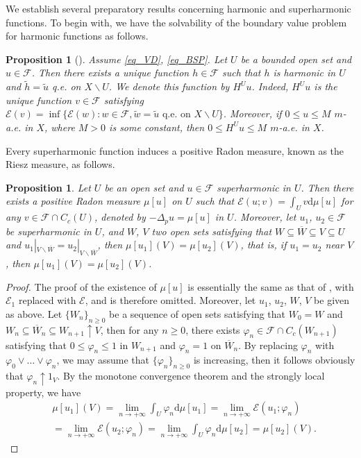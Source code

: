 \documentclass[11pt,a4paper]{article}
\numberwithin{equation}{section}
\theoremstyle{plain}
\newtheorem{proposition}[theorem]{Proposition}
\theoremstyle{definition}
\begin{document}
We establish several preparatory results concerning harmonic and superharmonic functions. To begin with, we have the solvability of the boundary value problem for harmonic functions as follows.

\begin{proposition}[{\cite[Proposition 4.2]{Yan25c}}]\label{prop_harm_exist}
Assume \ref{eq_VD}, \ref{eq_BSP}. Let $U$ be a bounded open set and $u\in\mathcal{F}$. Then there exists a unique function $h\in\mathcal{F}$ such that $h$ is harmonic in $U$ and $\widetilde{h}=\widetilde{u}$ q.e. on $X\backslash U$. We denote this function by $H^Uu$. Indeed, $H^Uu$ is the unique function $v\in \mathcal{F}$ satisfying $\mathcal{E}(v)=\inf \{\mathcal{E}(w):w\in \mathcal{F},\widetilde{w}=\widetilde{u}\text{ q.e. on }X\backslash U\}$. Moreover, if $0\le u\le M$ $m$-a.e. in $X$, where $M>0$ is some constant, then $0\le H^Uu\le M$ $m$-a.e. in $X$.
\end{proposition}

Every superharmonic function induces a positive Radon measure, known as the Riesz measure, as follows.

\begin{proposition}\label{prop_super_meas}
Let $U$ be an open set and $u\in\mathcal{F}$ superharmonic in $U$. Then there exists a positive Radon measure $\mu[u]$ on $U$ such that $\mathcal{E}(u;v)=\int_Uv\mathrm{d}\mu[u]$ for any $v\in\mathcal{F}\cap C_c(U)$, denoted by $-\Delta_pu=\mu[u]$ in $U$. Moreover, let $u_1$, $u_2\in\mathcal{F}$ be superharmonic in $U$, and $W$, $V$ two open sets satisfying that $W\subseteq \overline{W}\subseteq V\subseteq U$ and $u_1|_{V\backslash\overline{W}}=u_2|_{V\backslash\overline{W}}$, then $\mu[u_1](V)=\mu[u_2](V)$, that is, if $u_1=u_2$ near $V$, then $\mu[u_1](V)=\mu[u_2](V)$.
\end{proposition}

\begin{proof}
The proof of the existence of $\mu[u]$ is essentially the same as that of \cite[Proposition 8.9, ``(3)$\Rightarrow$(1)"]{Yan25a}, with $\mathcal{E}_1$ replaced with $\mathcal{E}$, and is therefore omitted. Moreover, let $u_1$, $u_2$, $W$, $V$ be given as above. Let $\{W_n\}_{n\ge0}$ be a sequence of open sets satisfying that $W_0=W$ and $W_n\subseteq\overline{W}_n\subseteq W_{n+1}\uparrow V$, then for any $n\ge0$, there exists $\varphi_n\in\mathcal{F}\cap C_c(W_{n+1})$ satisfying that $0\le\varphi_n\le1$ in $W_{n+1}$ and $\varphi_n=1$ on $\overline{W}_n$. By replacing $\varphi_n$ with $\varphi_0\vee\ldots\vee\varphi_n$, we may assume that $\{\varphi_n\}_{n\ge0}$ is increasing, then it follows obviously that $\varphi_n\uparrow1_V$. By the monotone convergence theorem and the strongly local property, we have
\begin{align*}
&\mu[u_1](V)=\lim_{n\to+\infty}\int_U\varphi_n\mathrm{d}\mu[u_1]=\lim_{n\to+\infty}\mathcal{E}(u_1;\varphi_n)\\
&=\lim_{n\to+\infty}\mathcal{E}(u_2;\varphi_n)=\lim_{n\to+\infty}\int_U\varphi_n\mathrm{d}\mu[u_2]=\mu[u_2](V).
\end{align*}
\end{proof}
\end{document}
